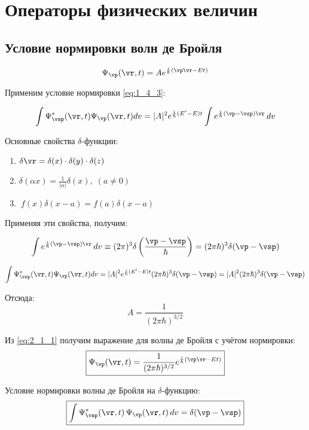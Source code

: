 \chapter{Операторы физических величин}

\section{Условие нормировки волн де Бройля}

\begin{equation}
\label{eq:2_1_1}
\Psi_{\vp}(\vr,t) = A e^{\frac{i}{\hbar}(\vp\vr-Et)}
\end{equation}

Применим условие нормировки \eqref{eq:1_4_3}:

$$\int \Psi^*_{\vsp}(\vr,t) \Psi_{\vp}(\vr,t) dv = |A|^2 e^{\frac{i}{\hbar}(E' - E)t} \int e^{\frac{i}{\hbar}(\vp - \vsp)\vr} \, dv$$

Основные свойства $\delta$-функции:
\begin{enumerate}
\item $ \delta {\vr} = \delta (x) \cdot \delta (y) \cdot \delta (z) $
\item $ \delta (\alpha x) = \frac{1}{|\alpha|} \delta (x), \; (a \ne 0) $
\item $~ f(x) \delta (x - a) = f(a) \delta(x-a)$
\end{enumerate}

Применяя эти свойства, получим:

$$\int e^{\frac{i}{\hbar}(\vp - \vsp)\vr} \, dv \equiv (2 \pi )^3 \delta \left( \frac{\vp - \vsp}{\hbar} \right) = (2 \pi \hbar)^3 \delta (\vp - \vsp)$$

$$\int \Psi^*_{\vsp}(\vr,t) \Psi_{\vp}(\vr,t) dv = |A|^2 e^{\frac{i}{\hbar}(E' - E)t} (2 \pi \hbar)^3 \delta (\vp - \vsp) = |A|^2 (2 \pi \hbar)^3 \delta (\vp - \vsp)$$

Отсюда: $$A = \frac{1}{(2 \pi \hbar)^{3/2}}$$

Из \eqref{eq:2_1_1} получим выражение для волны де Бройля с учётом нормировки:
\begin{equation}
\label{eq:2_1_2}
\boxed{\Psi_{\vp}(\vr,t) = \frac{1}{(2 \pi \hbar)^{3/2}} e^{\frac{i}{\hbar} (\vp \vr - Et)}}
\end{equation}

Условие нормировки волны де Бройля на $\delta$-функцию:
\begin{equation}
\label{eq:2_1_3}
\boxed{\int\Psi^*_{\vsp}(\vr,t) \, \Psi_{\vp}(\vr,t) \, dv = \delta (\vp - \vsp)}
\end{equation}

